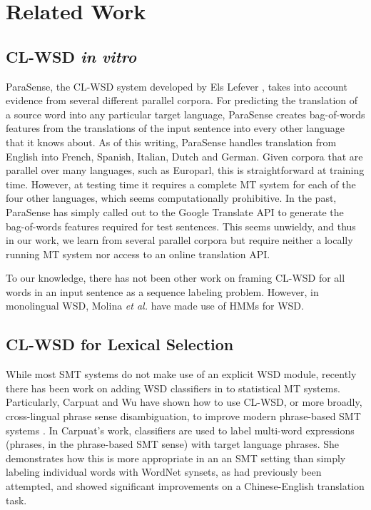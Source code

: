 \section{Related Work}
\label{sec:relatedwork}

\subsection{CL-WSD \emph{in vitro}}
ParaSense, the CL-WSD system developed by Els Lefever
\cite{lefever-hoste-decock:2011:ACL-HLT2011}, takes into account evidence from
several different parallel corpora.
For predicting the translation of a source word into
any particular target language, ParaSense creates
bag-of-words features from the translations of the input sentence into every
other language that it knows about. As of this writing, ParaSense handles
translation from English into French, Spanish, Italian, Dutch and German.
Given corpora that are parallel over many languages, such as Europarl, this is
straightforward at
training time. However, at testing time it requires a complete MT system for
each of the four other languages, which seems computationally prohibitive. In
the past, ParaSense has simply called out to the Google Translate API to
generate the bag-of-words features required for test sentences. This seems
unwieldy, and thus in our work, we learn from several parallel corpora but
require neither a locally running MT system nor access to an online translation
API.

To our knowledge, there has not been other work on framing CL-WSD for all words
in an input sentence as a sequence labeling problem. However, in monolingual
WSD, Molina \textit{et al.}  have made
use of HMMs for WSD. 


\subsection{CL-WSD for Lexical Selection}
While most SMT systems do not make use of an explicit WSD module, recently
there has been work on adding WSD classifiers in to statistical MT systems.
Particularly, Carpuat and Wu have shown how to use CL-WSD, or more broadly,
cross-lingual phrase sense disambiguation, to improve modern phrase-based SMT
systems
\cite{carpuatpsd,carpuat-wu:2007:EMNLP-CoNLL2007,carpuat2008evaluation}. In
Carpuat's work, classifiers are used to label multi-word expressions (phrases,
in the phrase-based SMT sense) with target language phrases. She demonstrates
how this is more appropriate in an an SMT setting than simply labeling
individual words with WordNet synsets, as had previously been attempted, and
showed significant improvements on a Chinese-English translation task.

